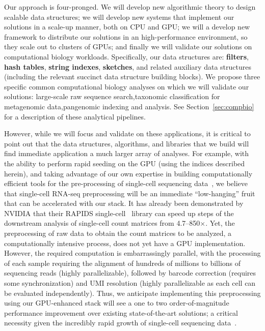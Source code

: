 {Our approach is four-pronged.}  We will develop new {algorithmic
theory} to design scalable data structures; we will develop new {systems} that
implement our solutions in a scale-up manner,  both on CPU and GPU\@; we will a
develop new framework to distribute our solutions in an high-performance environment, so
they scale out to clusters of GPUs; and finally we will validate our solutions
on {computational biology} workloads.
%
Specifically, our data structures are: \textbf{filters}, \textbf{hash tables},
\textbf{string indexes}, \textbf{sketches}, and related auxiliary data
structures (including the relevant succinct data structure building blocks).   We propose three specific common computational biology analyses on
which we will validate our solutions: {large-scale raw sequence
search},{taxonomic classification for metagenomic data},{pangenomic indexing
and analysis}.   See Section~\ref{sec:compbio} for a description of these
analytical pipelines.

However, while we will focus and validate on these applications, it is critical
to point out that the data structures, algorithms, and libraries that we build
will find immediate application a much larger array of analyses. For example, with the ability to perform
rapid seeding on the GPU (using the indices described herein), and taking
advantage of our own expertise in building computationally efficient tools for
the pre-processing of single-cell sequencing data~\cite{he2022alevin}, we
believe that single-cell RNA-seq preprocessing will be an immediate
``low-hanging'' fruit that can be accelerated with our stack. It has already
been demonstrated by NVIDIA that their RAPIDS single-cell~\cite{rapids} library
can speed up steps of the downstream analysis of single-cell count matrices
from 4.7--850$\times$. Yet, the preprocessing of raw data to obtain the count
matrices to be analyzed, a computationally intensive process, does not yet have
a GPU implementation. However, the required computation is embarrassingly
parallel, with the processing of each sample requiring the alignment of
hundreds of millions to billions of sequencing reads (highly parallelizable),
followed by barcode correction (requires some synchronization) and UMI
resolution (highly parallelizable as each cell can be evaluated independently).
Thus, we anticipate implementing this preprocessing using our GPU-enhanced
stack will see a one to two order-of-magnitude performance improvement over
existing state-of-the-art solutions; a critical necessity given the incredibly
rapid growth of single-cell sequencing data~\cite{scgrowth2022}.

